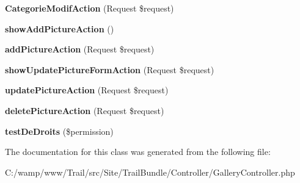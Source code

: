 \begin{DoxyCompactItemize}
\item 
\hypertarget{class_site_1_1_trail_bundle_1_1_controller_1_1_gallery_controller_a4c00d78b70b505827e20078f70fecf24}{}{\bfseries Categorie\+Modif\+Action} (Request \$request)\label{class_site_1_1_trail_bundle_1_1_controller_1_1_gallery_controller_a4c00d78b70b505827e20078f70fecf24}

\item 
\hypertarget{class_site_1_1_trail_bundle_1_1_controller_1_1_gallery_controller_a134ebe1830541f15410f0277f3bedca4}{}{\bfseries show\+Add\+Picture\+Action} ()\label{class_site_1_1_trail_bundle_1_1_controller_1_1_gallery_controller_a134ebe1830541f15410f0277f3bedca4}

\item 
\hypertarget{class_site_1_1_trail_bundle_1_1_controller_1_1_gallery_controller_a7400c24c1653de81f0f3a46cbba6d021}{}{\bfseries add\+Picture\+Action} (Request \$request)\label{class_site_1_1_trail_bundle_1_1_controller_1_1_gallery_controller_a7400c24c1653de81f0f3a46cbba6d021}

\item 
\hypertarget{class_site_1_1_trail_bundle_1_1_controller_1_1_gallery_controller_a9700c29dd473656b8ecb9b1151a9edc6}{}{\bfseries show\+Update\+Picture\+Form\+Action} (Request \$request)\label{class_site_1_1_trail_bundle_1_1_controller_1_1_gallery_controller_a9700c29dd473656b8ecb9b1151a9edc6}

\item 
\hypertarget{class_site_1_1_trail_bundle_1_1_controller_1_1_gallery_controller_a16cc29665b80a328cd73eb67f966afd1}{}{\bfseries update\+Picture\+Action} (Request \$request)\label{class_site_1_1_trail_bundle_1_1_controller_1_1_gallery_controller_a16cc29665b80a328cd73eb67f966afd1}

\item 
\hypertarget{class_site_1_1_trail_bundle_1_1_controller_1_1_gallery_controller_ad72d28dce8a8f29ef0cf360a8c00ce05}{}{\bfseries delete\+Picture\+Action} (Request \$request)\label{class_site_1_1_trail_bundle_1_1_controller_1_1_gallery_controller_ad72d28dce8a8f29ef0cf360a8c00ce05}

\item 
\hypertarget{class_site_1_1_trail_bundle_1_1_controller_1_1_gallery_controller_a49387e8719305355ba3fae06b0b9bc2a}{}{\bfseries test\+De\+Droits} (\$permission)\label{class_site_1_1_trail_bundle_1_1_controller_1_1_gallery_controller_a49387e8719305355ba3fae06b0b9bc2a}

\end{DoxyCompactItemize}


The documentation for this class was generated from the following file\+:\begin{DoxyCompactItemize}
\item 
C\+:/wamp/www/\+Trail/src/\+Site/\+Trail\+Bundle/\+Controller/Gallery\+Controller.\+php\end{DoxyCompactItemize}
